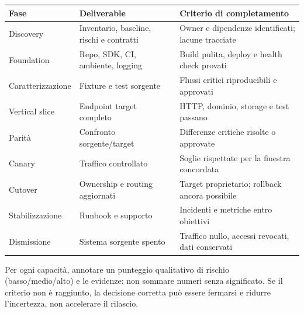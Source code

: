 \documentclass[
  italian,
  10pt,
]{book}
\newcounter{none} %
\begin{document}
{\def\LTcaptype{none} %
\begin{longtable}[]{@{}
  >{\raggedright\arraybackslash}p{}
  >{\raggedright\arraybackslash}p{}
  >{\raggedright\arraybackslash}p{}@{}}
\toprule\noalign{}
\begin{minipage}[b]{\linewidth}\raggedright
Fase
\end{minipage} & \begin{minipage}[b]{\linewidth}\raggedright
Deliverable
\end{minipage} & \begin{minipage}[b]{\linewidth}\raggedright
Criterio di completamento
\end{minipage} \\
\midrule\noalign{}
\endhead
\bottomrule\noalign{}
\endlastfoot
Discovery & Inventario, baseline, rischi e contratti & Owner e
dipendenze identificati; lacune tracciate \\
Foundation & Repo, SDK, CI, ambiente, logging & Build pulita, deploy e
health check provati \\
Caratterizzazione & Fixture e test sorgente & Flussi critici
riproducibili e approvati \\
Vertical slice & Endpoint target completo & HTTP, dominio, storage e
test passano \\
Parità & Confronto sorgente/target & Differenze critiche risolte o
approvate \\
Canary & Traffico controllato & Soglie rispettate per la finestra
concordata \\
Cutover & Ownership e routing aggiornati & Target proprietario; rollback
ancora possibile \\
Stabilizzazione & Runbook e supporto & Incidenti e metriche entro
obiettivi \\
Dismissione & Sistema sorgente spento & Traffico nullo, accessi
revocati, dati conservati \\
\end{longtable}
}

Per ogni capacità, annotare un punteggio qualitativo di rischio
(basso/medio/alto) e le evidenze: non sommare numeri senza significato.
Se il criterio non è raggiunto, la decisione corretta può essere
fermarsi e ridurre l'incertezza, non accelerare il rilascio.

\backmatter
\end{document}
